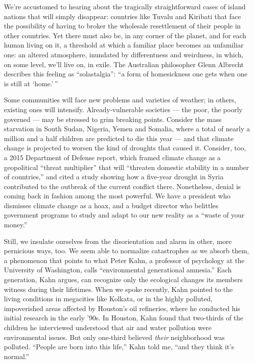 We're accustomed to hearing about the tragically straightforward cases
of island nations that will simply disappear: countries like Tuvalu and
Kiribati that face the possibility of having to broker the wholesale
resettlement of their people in other countries. Yet there must also be,
in any corner of the planet, and for each human living on it, a
threshold at which a familiar place becomes an unfamiliar one: an
altered atmosphere, inundated by differentness and weirdness, in which,
on some level, we'll live on, in exile. The Australian philosopher Glenn
Albrecht describes this feeling as ``solastalgia'': ``a form of
homesickness one gets when one is still at `home.' ''

Some communities will face new problems and varieties of weather; in
others, existing ones will intensify. Already-vulnerable societies ---
the poor, the poorly governed --- may be stressed to grim breaking
points. Consider the mass starvation in South Sudan, Nigeria, Yemen and
Somalia, where a total of nearly a million and a half children are
predicted to die this year --- and that climate change is projected to
worsen the kind of droughts that caused it. Consider, too, a 2015
Department of Defense report, which framed climate change as a
geopolitical ``threat multiplier'' that will ``threaten domestic
stability in a number of countries,'' and cited a study showing how a
five-year drought in Syria contributed to the outbreak of the current
conflict there. Nonetheless, denial is coming back in fashion among the
most powerful. We have a president who dismisses climate change as a
hoax, and a budget director who belittles government programs to study
and adapt to our new reality as a ``waste of your money.''

Still, we insulate ourselves from the disorientation and alarm in other,
more pernicious ways, too. We seem able to normalize catastrophes as we
absorb them, a phenomenon that points to what Peter Kahn, a professor of
psychology at the University of Washington, calls ``environmental
generational amnesia.'' Each generation, Kahn argues, can recognize only
the ecological changes its members witness during their lifetimes. When
we spoke recently, Kahn pointed to the living conditions in megacities
like Kolkata, or in the highly polluted, impoverished areas affected by
Houston's oil refineries, where he conducted his initial research in the
early '90s. In Houston, Kahn found that two-thirds of the children he
interviewed understood that air and water pollution were environmental
issues. But only one-third believed \emph{their} neighborhood was
polluted. ``People are born into this life,'' Kahn told me, ``and they
think it's normal.''

